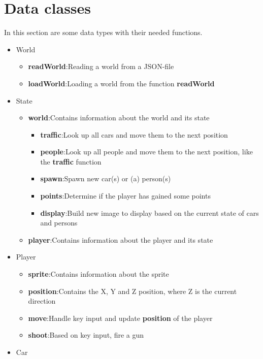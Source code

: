 \documentclass[12pt]{article}
\begin{document}
	\section{Data classes}
	In this section are some data types with their needed functions.
	\begin{itemize}
		\item World
			\begin{itemize}				
				\item \textbf{readWorld}:\quad Reading a world from a JSON-file
				\item \textbf{loadWorld}:\quad Loading a world from the function \textbf{readWorld}
			\end{itemize}
		\item State
			\begin{itemize}				
				\item \textbf{world}:\quad Contains information about the world and its state
					\begin{itemize}				
						\item \textbf{traffic}:\quad Look up all cars and move them to the next position
						\item \textbf{people}:\quad Look up all people and move them to the next position, like the \textbf{traffic} function
						\item \textbf{spawn}:\quad Spawn new car(s) or (a) person(s)
						\item \textbf{points}:\quad Determine if the player has gained some points
						\item \textbf{display}:\quad Build new image to display based on the current state of cars and persons
					\end{itemize}
				\item \textbf{player}:\quad Contains information about the player and its state
			\end{itemize}
		\item Player
			\begin{itemize}				
				\item \textbf{sprite}:\quad Contains information about the sprite
				\item \textbf{position}:\quad Contains the X, Y and Z position, where Z is the current direction
				\item \textbf{move}:\quad Handle key input and update \textbf{position} of the player
				\item \textbf{shoot}:\quad Based on key input, fire a gun
			\end{itemize}
		\item Car

\end{itemize}
\end{document}
